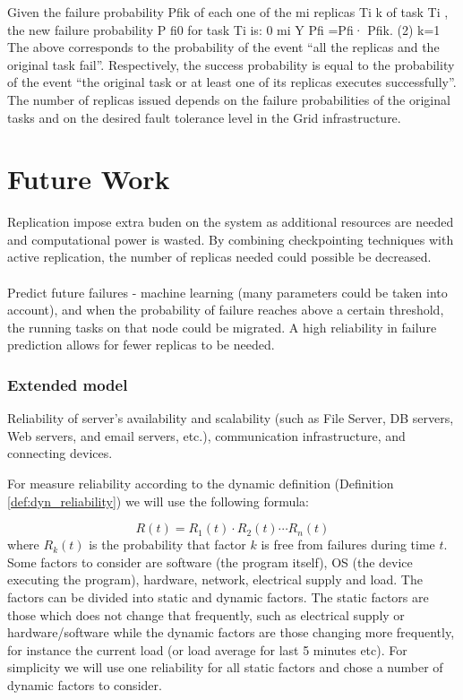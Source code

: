 \documentclass{cslthse-msc}
\begin{document}
Given the failure probability Pfik of each one of the mi replicas Ti k of task Ti , the new failure probability P fi0 for task Ti is:
0 mi Y
Pfi =Pfi· Pfik. (2) k=1
The above corresponds to the probability of the event “all the replicas and the original task fail”. Respectively, the success probability is equal to the probability of the event “the original task or at least one of its replicas executes successfully”. The number of replicas issued depends on the failure probabilities of the original tasks and on the desired fault tolerance level in the Grid infrastructure.  \cite{effTaskReplMobGrid}


\chapter{Future Work} \label{ch:future_work}
Replication impose extra buden on the system as additional resources are needed and computational power is wasted. By combining checkpointing techniques with active replication, the number of replicas needed could possible be decreased.
\\\\
Predict future failures - machine learning (many parameters could be taken into account), and when the probability of failure reaches above a certain threshold, the running tasks on that node could be migrated. A high reliability in failure prediction allows for fewer replicas to be needed.

\subsection{Extended model}
Reliability of server’s availability and scalability (such as File Server, DB servers, Web servers, and email servers, etc.), communication infrastructure, and connecting devices. \cite{surveyReliabilityDistr}

For measure reliability according to the dynamic definition (Definition \ref{def:dyn_reliability}) we will use the following formula:

\begin{equation} \label{eq:overall_reliability}
R(t) = R_{1}(t) \cdot R_{2}(t) \cdots R_{n}(t)
\end{equation}
where $R_{k}(t)$ is the probability that factor $k$ is free from failures during time $t$. Some factors to consider are software (the program itself), OS (the device executing the program), hardware, network, electrical supply and load. The factors can be divided into static and dynamic factors. The static factors are those which does not change that frequently, such as electrical supply or hardware/software while the dynamic factors are those changing more frequently, for instance the current load (or load average for last 5 minutes etc). For simplicity we will use one reliability for all static factors and chose a number of dynamic factors to consider.
\end{document}
